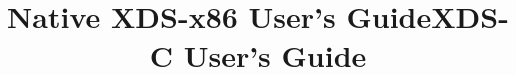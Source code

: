 \newcommand{\DocumentType}{User's Guide}
\newcommand{\VersionNumber}{2.51}

\FrameIsDeeptrue

\makeindex

\newcommand{\BookName}{\DocumentType}

\ifonline %
  \ifgencode
  \title{Native XDS-x86 \DocumentType}
  \else\ifgenc
  \title{XDS-C \DocumentType}
  \else\JNO
  \fi\fi
\fi
